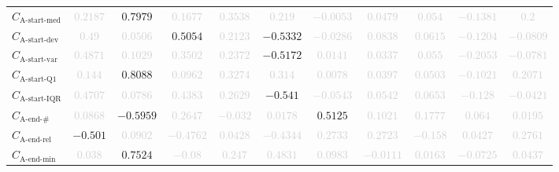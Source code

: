 \documentclass{standalone}
\newcommand{\startmedianname}{\text{A-start-med}}
\newcommand{\startmedian}{C_{\startmedianname}}
\newcommand{\startdevname}{\text{A-start-dev}}
\newcommand{\startdev}{C_{\startdevname}}
\newcommand{\startvarname}{\text{A-start-var}}
\newcommand{\startvar}{C_{\startvarname}}
\newcommand{\startqonename}{\text{A-start-Q1}}
\newcommand{\startqone}{C_{\startqonename}}
\newcommand{\startiqrname}{\text{A-start-IQR}}
\newcommand{\startiqr}{C_{\startiqrname}}
\newcommand{\lastactivitiesname}{\text{A-end-\#}}
\newcommand{\lastactivities}{C_{\lastactivitiesname}}
\newcommand{\lastactivitiesrelname}{\text{A-end-rel}}
\newcommand{\lastactivitiesrel}{C_{\lastactivitiesrelname}}
\newcommand{\lastminname}{\text{A-end-min}}
\newcommand{\lastmin}{C_{\lastminname}}
\begin{document}
\begin{tabular}{lcccccccccc}
$\startmedian$ & \textcolor{lightgray}{$0.2187$} & $0.7979$ & \textcolor{lightgray}{$0.1677$} & \textcolor{lightgray}{$0.3538$} & \textcolor{lightgray}{$0.219$} & \textcolor{lightgray}{$-0.0053$} & \textcolor{lightgray}{$0.0479$} & \textcolor{lightgray}{$0.054$} & \textcolor{lightgray}{$-0.1381$} & \textcolor{lightgray}{$0.2$} \\ 
$\startdev$ & \textcolor{lightgray}{$0.49$} & \textcolor{lightgray}{$0.0506$} & $0.5054$ & \textcolor{lightgray}{$0.2123$} & $-0.5332$ & \textcolor{lightgray}{$-0.0286$} & \textcolor{lightgray}{$0.0838$} & \textcolor{lightgray}{$0.0615$} & \textcolor{lightgray}{$-0.1204$} & \textcolor{lightgray}{$-0.0809$} \\ 
$\startvar$ & \textcolor{lightgray}{$0.4871$} & \textcolor{lightgray}{$0.1029$} & \textcolor{lightgray}{$0.3502$} & \textcolor{lightgray}{$0.2372$} & $-0.5172$ & \textcolor{lightgray}{$0.0141$} & \textcolor{lightgray}{$0.0337$} & \textcolor{lightgray}{$0.055$} & \textcolor{lightgray}{$-0.2053$} & \textcolor{lightgray}{$-0.0781$} \\ 
$\startqone$ & \textcolor{lightgray}{$0.144$} & $0.8088$ & \textcolor{lightgray}{$0.0962$} & \textcolor{lightgray}{$0.3274$} & \textcolor{lightgray}{$0.314$} & \textcolor{lightgray}{$0.0078$} & \textcolor{lightgray}{$0.0397$} & \textcolor{lightgray}{$0.0503$} & \textcolor{lightgray}{$-0.1021$} & \textcolor{lightgray}{$0.2071$} \\ 
$\startiqr$ & \textcolor{lightgray}{$0.4707$} & \textcolor{lightgray}{$0.0786$} & \textcolor{lightgray}{$0.4383$} & \textcolor{lightgray}{$0.2629$} & $-0.541$ & \textcolor{lightgray}{$-0.0543$} & \textcolor{lightgray}{$0.0542$} & \textcolor{lightgray}{$0.0653$} & \textcolor{lightgray}{$-0.128$} & \textcolor{lightgray}{$-0.0421$} \\ 
$\lastactivities$ & \textcolor{lightgray}{$0.0868$} & $-0.5959$ & \textcolor{lightgray}{$0.2647$} & \textcolor{lightgray}{$-0.032$} & \textcolor{lightgray}{$0.0178$} & $0.5125$ & \textcolor{lightgray}{$0.1021$} & \textcolor{lightgray}{$0.1777$} & \textcolor{lightgray}{$0.064$} & \textcolor{lightgray}{$0.0195$} \\ 
$\lastactivitiesrel$ & $-0.501$ & \textcolor{lightgray}{$0.0902$} & \textcolor{lightgray}{$-0.4762$} & \textcolor{lightgray}{$0.0428$} & \textcolor{lightgray}{$-0.4344$} & \textcolor{lightgray}{$0.2733$} & \textcolor{lightgray}{$0.2723$} & \textcolor{lightgray}{$-0.158$} & \textcolor{lightgray}{$0.0427$} & \textcolor{lightgray}{$0.2761$} \\ 
$\lastmin$ & \textcolor{lightgray}{$0.038$} & $0.7524$ & \textcolor{lightgray}{$-0.08$} & \textcolor{lightgray}{$0.247$} & \textcolor{lightgray}{$0.4831$} & \textcolor{lightgray}{$0.0983$} & \textcolor{lightgray}{$-0.0111$} & \textcolor{lightgray}{$0.0163$} & \textcolor{lightgray}{$-0.0725$} & \textcolor{lightgray}{$0.0437$} \\ 

\end{tabular}
\end{document}
